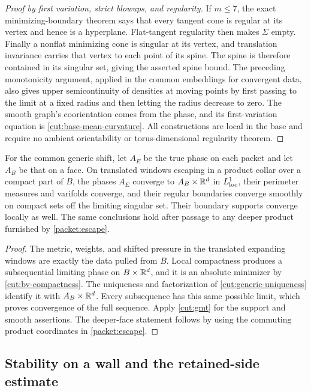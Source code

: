 \begin{proof}[Proof by first variation, strict blowups, and regularity]
If $m\le7$, the exact minimizing-boundary theorem says that every tangent
cone is regular at its vertex and hence is a hyperplane.  Flat-tangent
regularity then makes $\Sigma$ empty.  Finally a nonflat minimizing
cone is singular at its vertex, and translation invariance carries
that vertex to each point of its spine.  The spine is therefore
contained in its singular set, giving the asserted spine bound.
The preceding monotonicity argument, applied in the common embeddings
for convergent data, also gives upper semicontinuity of densities at
moving points by first passing to the limit at a fixed radius and then
letting the radius decrease to zero.  The smooth graph's coorientation
comes from the phase, and its first-variation equation is
\eqref{cut:base-mean-curvature}.  All constructions are local in the
base and require no ambient orientability or torus-dimensional
regularity theorem.
\end{proof}


\begin{corollary}
\label{cut:end-convergence}
For the common generic shift, let $A_E$ be the true phase on each packet
and let $A_B$ be that on a face.  On translated windows escaping in a
product collar over a compact part of $B$, the phases $A_E$ converge to
$A_B\times\mathbb R^d$ in $L^1_{\rm loc}$, their perimeter measures and
varifolds converge, and their regular boundaries converge smoothly on
compact sets off the limiting singular set.  Their boundary supports
converge locally as well.  The same conclusions hold after passage to
any deeper product furnished by \cref{packet:escape}.
\end{corollary}

\begin{proof}
The metric, weights, and shifted pressure in the translated expanding
windows are exactly the data pulled from $B$.  Local compactness
produces a subsequential limiting phase on $B\times\mathbb R^d$, and it is
an absolute minimizer by \cref{cut:bv-compactness}.  The uniqueness and
factorization of \cref{cut:generic-uniqueness} identify it with
$A_B\times\mathbb R^d$.  Every subsequence has this same possible limit, which
proves convergence of the full sequence.  Apply \cref{cut:gmt} for the
support and smooth assertions.  The deeper-face statement follows by
using the commuting product coordinates in \cref{packet:escape}.
\end{proof}

\subsection{Stability on a wall and the retained-side estimate}

